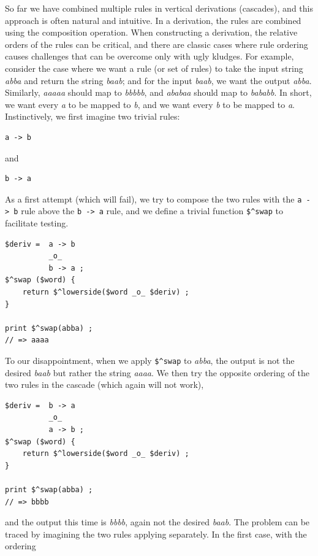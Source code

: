 So far we have combined multiple rules in vertical derivations (cascades), and this
approach is often natural and intuitive.  In a derivation, the rules are combined
using the composition operation.  When constructing a derivation, the relative orders of the
rules can be critical, and there are classic cases where rule ordering causes challenges
that can be overcome only with ugly kludges.  For example, consider the case where we want
a rule (or set of rules) to take the input string \emph{abba} and return the string
\emph{baab}; and for the input \emph{baab}, we want the output \emph{abba}.  Similarly,
\emph{aaaaa} should map to \emph{bbbbb}, and \emph{ababaa} should map to \emph{bababb}.  In
short, we want every \emph{a} to be mapped to \emph{b}, and we want every \emph{b} to be
mapped to \emph{a}.  Instinctively, we first imagine two trivial rules:


\begin{Verbatim}
a -> b 
\end{Verbatim}

\noindent
and

\begin{Verbatim}
b -> a
\end{Verbatim}

As a first attempt (which will fail), we try to compose the two rules with the \verb!a -> b! rule above the
\verb!b -> a! rule, and we define a trivial function \verb!$^swap! to facilitate testing.


\begin{Verbatim}
$deriv =  a -> b
          _o_
          b -> a ;
$^swap ($word) { 
    return $^lowerside($word _o_ $deriv) ;
}

print $^swap(abba) ;
// => aaaa
\end{Verbatim}

\noindent
To our disappointment, when we apply \verb!$^swap! to \emph{abba}, the output is not the desired
\emph{baab} but rather the string \emph{aaaa}.  We then try the opposite ordering of the
two rules in the cascade (which again will not work),

\begin{Verbatim}
$deriv =  b -> a
          _o_
          a -> b ;
$^swap ($word) { 
    return $^lowerside($word _o_ $deriv) ;
}

print $^swap(abba) ;
// => bbbb
\end{Verbatim}

\noindent
and the output this time is \emph{bbbb}, again not the desired \emph{baab}.  The problem
can be traced by imagining the two rules applying separately.  In the first case, with the
ordering


